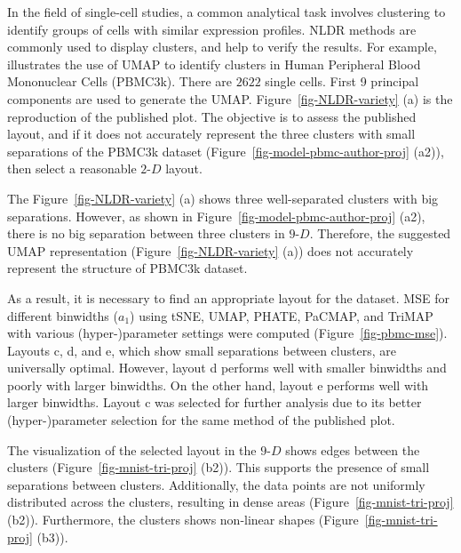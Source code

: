 \documentclass[
  12pt]{article}
\newcommand\gD{$2\text{-}D$}
\begin{document}
In the field of single-cell studies, a common analytical task involves
clustering to identify groups of cells with similar expression profiles.
NLDR methods are commonly used to display clusters, and help to verify
the results. For example, \citet{chen2023} illustrates the use of UMAP
to identify clusters in Human Peripheral Blood Mononuclear Cells
(PBMC3k). There are \(2622\) single cells. First 9 principal components
are used to generate the UMAP. Figure~\ref{fig-NLDR-variety} (a) is the
reproduction of the published plot. The objective is to assess the
published layout, and if it does not accurately represent the three
clusters with small separations of the PBMC3k dataset
(Figure~\ref{fig-model-pbmc-author-proj} (a2)), then select a reasonable
\gD{} layout.

The Figure~\ref{fig-NLDR-variety} (a) shows three well-separated
clusters with big separations. However, as shown in
Figure~\ref{fig-model-pbmc-author-proj} (a2), there is no big separation
between three clusters in \(9\text{-}D\). Therefore, the suggested UMAP
representation (Figure~\ref{fig-NLDR-variety} (a)) does not accurately
represent the structure of PBMC3k dataset.

As a result, it is necessary to find an appropriate layout for the
dataset. MSE for different binwidths (\(a_1\)) using tSNE, UMAP, PHATE,
PaCMAP, and TriMAP with various (hyper-)parameter settings were computed
(Figure~\ref{fig-pbmc-mse}). Layouts c, d, and e, which show small
separations between clusters, are universally optimal. However, layout d
performs well with smaller binwidths and poorly with larger binwidths.
On the other hand, layout e performs well with larger binwidths. Layout
c was selected for further analysis due to its better (hyper-)parameter
selection for the same method of the published plot.

The visualization of the selected layout in the \(9\text{-}D\) shows
edges between the clusters (Figure~\ref{fig-mnist-tri-proj} (b2)). This
supports the presence of small separations between clusters.
Additionally, the data points are not uniformly distributed across the
clusters, resulting in dense areas (Figure~\ref{fig-mnist-tri-proj}
(b2)). Furthermore, the clusters shows non-linear shapes
(Figure~\ref{fig-mnist-tri-proj} (b3)).
\end{document}
